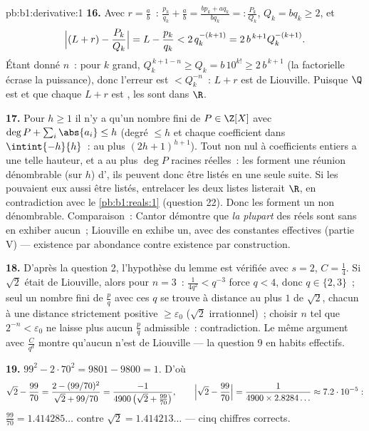 \begin{solution}{pb:b1:derivative:1}
\textbf{16.} Avec $r = \frac ab$~: $\frac{p_k}{q_k} + \frac ab =
\frac{b p_k + a q_k}{b q_k} =: \frac{P_k}{Q_k}$, $Q_k = b q_k
\geq 2$, et
\[
\Bigl|(L + r) - \frac{P_k}{Q_k}\Bigr| = L - \frac{p_k}{q_k}
< 2\,q_k^{-(k+1)} = 2\,b^{\,k+1} Q_k^{-(k+1)} .
\]
Étant donné $n$~: pour $k$ grand, $Q_k^{\,k+1-n} \geq Q_k = b\,10^{k!}
\geq 2\,b^{\,k+1}$ (la factorielle écrase la puissance), donc
l'erreur est $< Q_k^{-n}$~: $L + r$ est de Liouville. Puisque $\Q$ est 
et que chaque $L + r$ est , les  sont
 dans $\R$.

\textbf{17.} Pour $h \geq 1$ il n'y a qu'un nombre fini de $P \in
\Z[X]$ avec $\deg P + \sum_i \abs{a_i} \leq h$ (degré $\leq h$
et chaque coefficient dans $\intint{-h}{h}$~: au plus
$(2h+1)^{h+1}$). Tout  non nul à coefficients entiers a une telle
hauteur, et a au plus $\deg P$ racines réelles~: les  forment une réunion dénombrable (sur $h$) d', ils
peuvent donc être listés en une seule suite. Si les  pouvaient
eux aussi être listés, entrelacer les deux listes listerait $\R$,
en contradiction avec le \cref{pb:b1:reals:1} (question 22). Donc les  forment un  non dénombrable. Comparaison~:
Cantor démontre que \emph{la plupart} des réels sont  sans en exhiber
aucun~; Liouville en exhibe un, avec des constantes effectives (partie V)
--- existence par abondance contre existence par construction.

\textbf{18.} D'après la question 2, l'hypothèse du lemme est vérifiée avec $s
= 2$, $C = \frac14$. Si $\sqrt2$ était de Liouville, alors pour $n =
3$~: $\frac{1}{4q^2} < q^{-3}$ force $q < 4$, donc $q \in \{2,
3\}$~; seul un nombre fini de $\frac pq$ avec ces $q$ se trouve à distance
au plus $1$ de $\sqrt2$, chacun à une distance strictement positive
$\geq \varepsilon_0$ ($\sqrt2$ irrationnel)~; choisir $n$ tel que
$2^{-n} < \varepsilon_0$ ne laisse plus aucun $\frac pq$ admissible~:
contradiction. Le même argument avec $\frac{C}{q^d}$ montre qu'aucun
 n'est de Liouville --- la question 9 en habits effectifs.

\textbf{19.} $99^2 - 2\cdot70^2 = 9801 - 9800 = 1$. D'où
\[
\sqrt2 - \frac{99}{70} =
\frac{2 - (99/70)^2}{\sqrt2 + 99/70}
= \frac{-1}{4900\,\bigl(\sqrt2 + \tfrac{99}{70}\bigr)} ,
\qquad
\Bigl|\sqrt2 - \frac{99}{70}\Bigr|
= \frac{1}{4900 \times 2.8284\dots} \approx 7.2\cdot10^{-5} :
\]
$\frac{99}{70} = 1.414285\dots$ contre $\sqrt2 =
1.414213\dots$ --- cinq chiffres corrects.


\end{solution}
